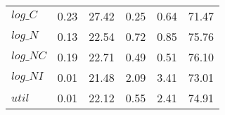 \begin{center}
\begin{longtable}{lccccc}
$log\_C          $	 & 	        0.23	 & 	       27.42	 & 	        0.25	 & 	        0.64	 & 	       71.47 \\ 
$log\_N          $	 & 	        0.13	 & 	       22.54	 & 	        0.72	 & 	        0.85	 & 	       75.76 \\ 
$log\_NC         $	 & 	        0.19	 & 	       22.71	 & 	        0.49	 & 	        0.51	 & 	       76.10 \\ 
$log\_NI         $	 & 	        0.01	 & 	       21.48	 & 	        2.09	 & 	        3.41	 & 	       73.01 \\ 
${util}          $	 & 	        0.01	 & 	       22.12	 & 	        0.55	 & 	        2.41	 & 	       74.91 \\ 
\end{longtable}
 \end{center}

